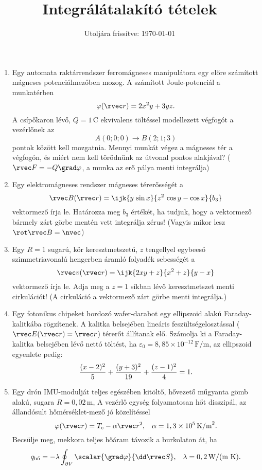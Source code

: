 \documentclass[a4paper, 12pt]{scrartcl}
\title{Integrálátalakító tételek}
\date{Utoljára frissítve: \today}
\newcommand\coordv{\rvec r}
\begin{document}
\allowdisplaybreaks

\maketitle

\begin{enumerate}
  \item Egy automata raktárrendszer ferromágneses manipulátora egy előre
        számított mágneses potenciálmezőben mozog. A számított Joule-potenciál a
        munkatérben
        $$
          \varphi(\coordv) = 2x^2 y + 3yz
          \text.
        $$
        A csípőkaron lévő, $Q = 1\,\text{C}$ ekvivalens töltéssel modellezett
        végfogót a vezérlőnek az
        $$
          A(0;0;0) \rightarrow B(2;1;3)
        $$
        pontok között kell mozgatnia. Mennyi munkát végez a mágneses tér a
        végfogón, és miért nem kell törődnünk az útvonal pontos alakjával?
        ($\rvec F = -Q \grad \varphi$, a munka az erő pálya menti integrálja)

  \item Egy elektromágneses rendszer mágneses térerősségét a
        $$
          \rvec B(\coordv) = \ijk{y \, \sin x}{z^2 \, \cos y - \cos x}{b_3}
        $$
        vektormező írja le. Határozza meg $b_3$ értékét, ha tudjuk, hogy
        a vektormező bármely zárt görbe mentén vett integrálja zérus!
        (Vagyis mikor lesz $\rot \rvec B = \nvec$)

  \item Egy $R = 1$ sugarú, kör keresztmetszetű, $z$ tengellyel egybeeső
        szimmetriavonalú hengerben áramló folyadék sebességét a
        $$
          \rvec v(\coordv) = \ijk{2xy + z}{x^2 + z}{y - x}
        $$
        vektormező írja le. Adja meg a $z = 1$ síkban lévő keresztmetszet
        menti cirkulációt!
        (A cirkuláció a vektormező zárt görbe menti integrálja.)

  \item Egy fotonikus chipeket hordozó wafer-darabot egy ellipszoid alakú
        Faraday-kalitkába rögzítenek. A kalitka belsejében lineáris
        feszültségelosztással ($\rvec E(\coordv) = \coordv$) térerőt állítanak
        elő. Számolja ki a Faraday-kalitka belsejében lévő nettó töltést, ha
        $\varepsilon_0 = 8,85 \times 10^{-12} \, \text{F/m}$, az ellipszoid
        egyenlete pedig:
        $$
          \frac{(x - 2)^2}{5} + \frac{(y + 3)^2}{19} + \frac{(z - 1)^2}{4} = 1
          \text.
        $$

  \item Egy drón IMU-modulját teljes egészében kitöltő, hővezető műgyanta gömb
        alakú, sugara $R = 0,02 \, \text{m}$, A vezérlő egység folyamatosan
        hőt disszipál, az állandósult hő\-mér\-sék\-let-mező jó közelítéssel
        $$
          \varphi(\coordv) = T_c - \alpha \rvec r^2
          \text, \quad
          \alpha = 1,3 \times 10^5 \,\text{K/m}^2
          \text.
        $$
        Becsülje meg, mekkora teljes hőáram távozik a burkolaton át, ha
        $$
          q_{\text{hő}}
          = -\lambda \oint_{\partial V} \scalar{\grad \varphi}{\dd \rvec S}
          \text,\quad
          \lambda = 0,2 \, \text{W/(m K)}
          \text.
        $$
\end{enumerate}
\end{document}
